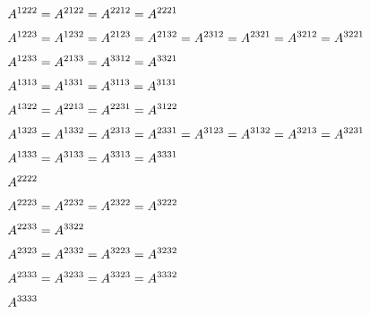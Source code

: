 \begin{align*}
\\[\jot]
A^{1222} & = A^{2122} = A^{2212} = A^{2221}
\\[\jot]
A^{1223} & = A^{1232} = A^{2123} = A^{2132} = A^{2312} = A^{2321} = A^{3212} = A^{3221}
\\[\jot]
A^{1233} & = A^{2133} = A^{3312} = A^{3321}
\\[\jot]
A^{1313} & = A^{1331} = A^{31\hspace{-0.1ex}13} = A^{3131}
\\[\jot]
A^{1322} & = A^{2213} = A^{2231} = A^{3122}
\\[\jot]
A^{1323} & = A^{1332} = A^{2313} = A^{2331} = A^{3123} = A^{3132} = A^{3213} = A^{3231}
\\[\jot]
A^{1333} & = A^{3133} = A^{3313} = A^{3331}
\\[\jot]
A^{2222} &
\\[\jot]
A^{2223} & = A^{2232} = A^{2322} = A^{3222}
\\[\jot]
A^{2233} & = A^{3322}
\\[\jot]
A^{2323} & = A^{2332} = A^{3223} = A^{3232}
\\[\jot]
A^{2333} & = A^{3233} = A^{3323} = A^{3332}
\\[\jot]
A^{3333} &
\vspace{-1em}\end{align*}

\endgroup
